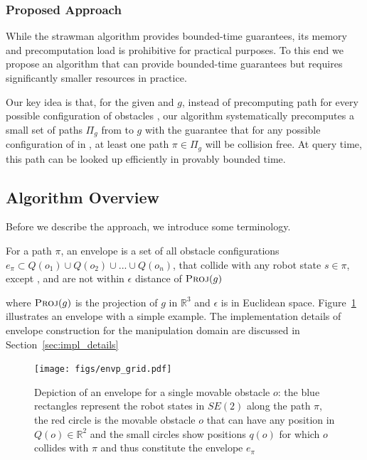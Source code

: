 \documentclass[a4paper]{report}
\begin{document}
\subsubsection{Proposed Approach}
While the strawman algorithm provides bounded-time guarantees, its memory and precomputation load is prohibitive for practical purposes. To this end we propose an algorithm that can provide bounded-time guarantees but requires significantly smaller resources in practice.

Our key idea is that, for the given \Sstart and $g$, instead of precomputing path for every possible configuration of obstacles \calO, our algorithm systematically precomputes a small set of paths $\Pi_g$ from \Sstart to $g$ with the guarantee that for any possible configuration of \calO in \calW, at least one path $\pi \in \Pi_g$ will be collision free. At query time, this path can be looked up efficiently in provably bounded time.

\subsection{Algorithm Overview}
Before we describe the approach, we introduce some terminology.

\begin{definition}[Envelope]
\label{def:envp}
For a path $\pi$, an envelope is a set of all obstacle configurations $e_\pi \subset Q(o_1) \cup Q(o_2) \cup...\cup Q(o_n)$, that collide with any robot state $s \in \pi$, except \Sstart, and are not within $\epsilon$ distance of $\textsc{Proj}(g)$
\end{definition}

\noindent where $\textsc{Proj}(g)$ is the projection of $g$ in $\mathbb{R}^3$ and $\epsilon$ is in Euclidean space. Figure~\ref{fig:envp} illustrates an envelope with a simple example.
The implementation details of envelope construction for the manipulation domain are discussed in Section~\ref{sec:impl_details}

\begin{figure}[bt]
\centering
 \texttt{[image: figs/envp\_grid.pdf]}
\caption{Depiction of an envelope for a single movable obstacle $o$: the blue rectangles represent the robot states in $SE(2)$ along the path $\pi$, the red circle is the movable obstacle $o$ that can have any position in $Q(o) \in \mathbb{R}^2$ and the small circles show positions $q(o)$ for which $o$ collides with $\pi$ and thus constitute the envelope $e_\pi$}
\label{fig:envp}
\end{figure}
\end{document}
